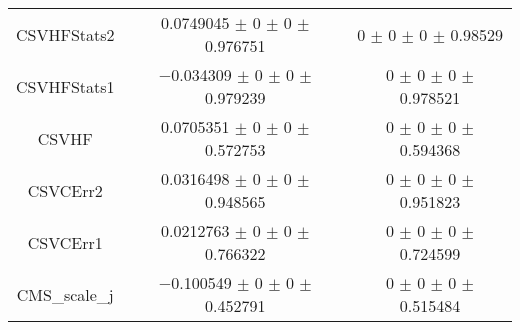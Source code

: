 \begin{table}
\begin{tabular}{ccc}
CSVHFStats2 	& \num{0.0749045} $\pm$ \num{0} $\pm$ \num{0} $\pm$ \num{0.976751} 	& \num{0} $\pm$ \num{0} $\pm$ \num{0} $\pm$ \num{0.98529}\\
CSVHFStats1 	& \num{-0.034309} $\pm$ \num{0} $\pm$ \num{0} $\pm$ \num{0.979239} 	& \num{0} $\pm$ \num{0} $\pm$ \num{0} $\pm$ \num{0.978521}\\
CSVHF 	& \num{0.0705351} $\pm$ \num{0} $\pm$ \num{0} $\pm$ \num{0.572753} 	& \num{0} $\pm$ \num{0} $\pm$ \num{0} $\pm$ \num{0.594368}\\
CSVCErr2 	& \num{0.0316498} $\pm$ \num{0} $\pm$ \num{0} $\pm$ \num{0.948565} 	& \num{0} $\pm$ \num{0} $\pm$ \num{0} $\pm$ \num{0.951823}\\
CSVCErr1 	& \num{0.0212763} $\pm$ \num{0} $\pm$ \num{0} $\pm$ \num{0.766322} 	& \num{0} $\pm$ \num{0} $\pm$ \num{0} $\pm$ \num{0.724599}\\
CMS\_scale\_j 	& \num{-0.100549} $\pm$ \num{0} $\pm$ \num{0} $\pm$ \num{0.452791} 	& \num{0} $\pm$ \num{0} $\pm$ \num{0} $\pm$ \num{0.515484}\\
\bottomrule
\end{tabular}
\end{table}